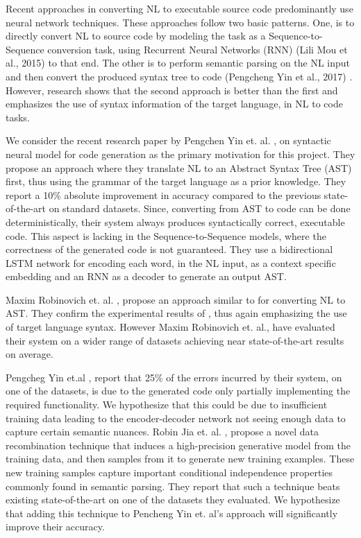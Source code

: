 \documentclass{IEEEtran}
\begin{document}
    Recent approaches in converting NL to executable source code predominantly use 
    neural network techniques. These approaches follow two basic patterns. One, is to 
    directly convert NL to source code by modeling the task as a Sequence-to-Sequence 
    conversion task, using Recurrent Neural Networks (RNN) (Lili Mou et al., 2015) 
    \cite{mou2015end}
    to that end. The other is to perform semantic parsing on the NL input and then convert 
    the produced syntax tree to code (Pengcheng Yin et al., 2017) \cite{yin2017syntactic}. 
    However, research \cite{yin2017syntactic} 
    shows that the second approach is better than the first and emphasizes the use of 
    syntax information of the target language, in NL to code tasks.

    We consider the recent research paper by Pengchen Yin et. al. 
    \cite{yin2017syntactic} , on syntactic neural 
    model for code generation as the primary motivation for this project. They propose 
    an approach where they translate NL to an Abstract Syntax Tree (AST) first, thus using 
    the grammar of the target language as a prior knowledge. They report a 10\% absolute 
    improvement in accuracy compared to the previous state-of-the-art on standard datasets. 
    Since, converting from AST to code can be done deterministically, their system always 
    produces syntactically correct, executable code. This aspect is lacking in the 
    Sequence-to-Sequence models, where the correctness of the generated code is not 
    guaranteed. They use a bidirectional LSTM network for encoding each word, in the NL input, 
    as  a context specific embedding and an RNN as a decoder to generate an output AST.

    Maxim Robinovich et. al. \cite{rabinovich2017abstract}, propose an approach similar 
    to \cite{yin2017syntactic} 
    for converting NL to AST. 
    They confirm the experimental results of \cite{yin2017syntactic}, thus again emphasizing
    the use of target 
    language syntax. However Maxim Robinovich et. al., have evaluated their system on a wider 
    range of datasets achieving near state-of-the-art results on average.

    Pengcheg Yin et.al \cite{yin2017syntactic}, report that 25\% of the errors incurred by 
    their system, on one of the datasets, is due to the generated code only partially 
    implementing the required functionality. We hypothesize that this could be due to 
    insufficient training data leading to the encoder-decoder network not seeing enough data 
    to capture certain semantic nuances. 
    Robin Jia et. al. \cite{jia2016data}, propose a novel data recombination technique that 
    induces a high-precision generative model from the training data, and then samples 
    from it to generate 
    new training examples. These new training samples capture important conditional independence 
    properties commonly found in semantic parsing. They report that such a technique beats 
    existing state-of-the-art on one of the datasets they evaluated. We hypothesize that adding 
    this technique to Pencheng Yin et. al’s approach will significantly improve their accuracy.
\end{document}
